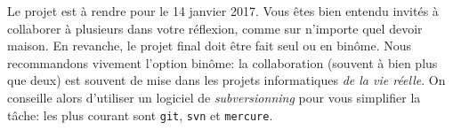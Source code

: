 \documentclass[french,a4paper]{article}
\theoremstyle{definition}
\theoremstyle{remark}
\newcommand{\shell}[1]{\lstinline[style={},style=sh]|#1|}
\begin{document}
\bigskip

Le projet est à rendre pour le 14 janvier 2017. Vous êtes bien entendu
invités à collaborer à plusieurs dans votre réflexion, comme sur
n'importe quel devoir maison. En revanche, le projet final doit être
fait seul ou en binôme. Nous recommandons vivement l'option binôme: la
collaboration (souvent à bien plus que deux) est souvent de mise dans
les projets informatiques {\em de la vie réelle}. On conseille alors
d'utiliser un logiciel de {\em subversionning} pour vous simplifier la
tâche: les plus courant sont \shell{git}, \shell{svn} et
\shell{mercure}.
\end{document}
